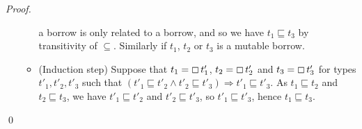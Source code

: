 \begin{proof}
\begin{itemize}
\begin{itemize}
      a borrow is only related to a borrow, and so we have
      $t_1\sqsubseteq t_3$ by transitivity of $\subseteq$.
      Similarly if $t_1$, $t_2$ or $t_3$ is a mutable borrow.
      \item (Induction step) Suppose that $t_1=\boxempty\,{t'_1}$,
      $t_2=\boxempty\,{t'_2}$ and $t_3=\boxempty\,{t'_3}$ for types
      $t'_1,t'_2,t'_3$ such that
      $(t'_1 \sqsubseteq t'_2 \land t'_2 \sqsubseteq t'_3) \Rightarrow
      t'_1 \sqsubseteq t'_3$.
      As $t_1 \sqsubseteq t_2$ and $t_2 \sqsubseteq t_3$, we have
      $t'_1 \sqsubseteq t'_2$ and $t'_2 \sqsubseteq t'_3$, so
      $t'_1 \sqsubseteq t'_3$, hence $t_1 \sqsubseteq t_3$.
    \end{itemize}
  \end{itemize}
  \qed
\end{proof}



